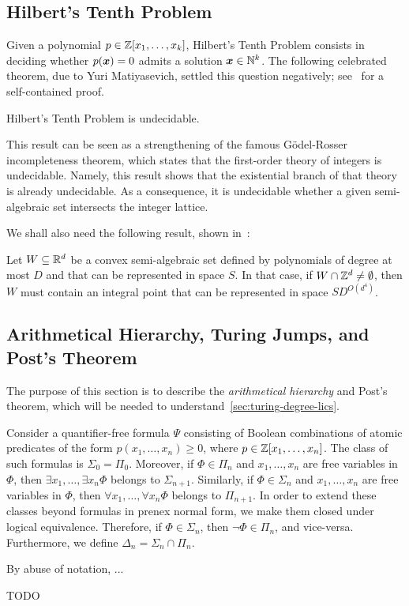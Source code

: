 \subsection{Hilbert's Tenth Problem}
Given a polynomial $p \in \mathbb{Z}[x_{1}, \ldots, x_{k}]$, Hilbert's Tenth Problem consists in deciding whether $p(\boldsymbol{x}) = 0$ admits a solution $\boldsymbol{x} \in \mathbb{N}^{k}$. The following celebrated theorem, due to Yuri Matiyasevich, settled this question negatively; see~\cite{HTP} for a self-contained proof.
\begin{theorem}[Matiyasevich]
\label{thm:HTP}
Hilbert's Tenth Problem is undecidable.
\end{theorem}
This result can be seen as a strengthening of the famous G\"{o}del-Rosser incompleteness theorem, which states that the first-order theory of integers is undecidable. Namely, this result shows that the existential branch of that theory is already undecidable. As a consequence, it is undecidable whether a given semi-algebraic set intersects the integer lattice.

We shall also need the following result, shown in~\cite{KhachiyanP97}:
\begin{theorem}
\label{thm:kp}
Let $W\subseteq\mathbb{R}^{d}$ be a convex semi-algebraic set defined by
polynomials of degree at most $D$ and that can be represented in space
$S$. In that case, if $W\cap\mathbb{Z}^{d}\neq\emptyset$, then $W$ must
contain an integral point that can be represented in space
$SD^{O(d^4)}$.
\end{theorem}

\subsection{Arithmetical Hierarchy, Turing Jumps, and Post's Theorem}
The purpose of this section is to describe the \emph{arithmetical hierarchy} and Post's theorem, which will be needed to understand~\cref{sec:turing-degree-lics}.

Consider a quantifier-free formula $\Psi$ consisting of Boolean combinations of atomic predicates of the form $p(x_{1}, \ldots, x_{n}) \geq 0$, where $p \in \mathbb{Z}[x_{1}, \ldots, x_{n}]$.
The class of such formulas is $\Sigma_{0}=\Pi_{0}$.
Moreover, if $\Phi \in \Pi_{n}$ and $x_{1}, \ldots, x_{n}$ are free variables in $\Phi$, then $\exists x_{1}, \ldots, \exists x_{n} \Phi$ belongs to $\Sigma_{n+1}$.
Similarly, if $\Phi \in \Sigma_{n}$ and $x_{1}, \ldots, x_{n}$ are free variables in $\Phi$, then $\forall x_{1}, \ldots, \forall x_{n} \Phi$ belongs to $\Pi_{n+1}$.
In order to extend these classes beyond formulas in prenex normal form, we make them closed under logical equivalence. Therefore, if $\Phi \in \Sigma_{n}$, then $\neg \Phi \in \Pi_{n}$, and vice-versa.
Furthermore, we define $\Delta_{n} = \Sigma_{n} \cap \Pi_{n}$.

By abuse of notation, ...%

\begin{theorem}[Post]
  \label{thm:Post}
  TODO
\end{theorem}
